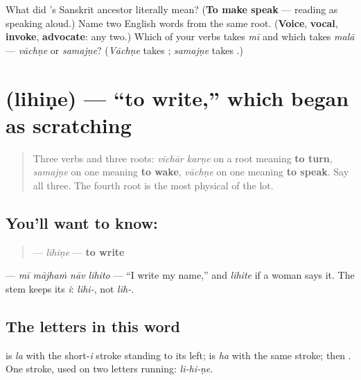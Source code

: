 \begin{tcolorbox}[breakable,colback=teal!4,colframe=teal!35!black,title={Before you move on}]
What did \textbf{}'s Sanskrit ancestor literally mean? (\textbf{To make speak} — reading as speaking aloud.) Name two English words from the same root. (\textbf{Voice}, \textbf{vocal}, \textbf{invoke}, \textbf{advocate}: any two.) Which of your verbs takes \emph{mī} and which takes \emph{malā} — \emph{vāchṇe} or \emph{samajṇe}? (\emph{Vāchṇe} takes \textbf{}; \emph{samajṇe} takes \textbf{}.)
\end{tcolorbox}
\section[lihiṇe]{ (lihiṇe) — \textquotedblleft{}to write,\textquotedblright{} which began as scratching}

\label{lesson:MR-C08-lihine}



\begin{quote}
Three verbs and three roots: \emph{vichār karṇe} on a root meaning \textbf{to turn}, \emph{samajṇe} on one meaning \textbf{to wake}, \emph{vāchṇe} on one meaning \textbf{to speak}. Say all three. The fourth root is the most physical of the lot.
\end{quote}

\subsection*{You'll want to know: }
\begin{quote}
\textbf{} — \emph{lihiṇe} — \textbf{to write}
\end{quote}

\textbf{   } — \emph{mī mājhaṁ nāv lihito} — \textquotedblleft{}I write my name,\textquotedblright{} and \textbf{} \emph{lihite} if a woman says it. The stem keeps its \emph{i}: \emph{lihi-}, not \emph{lih-}.

\subsection*{The letters in this word}
\textbf{} is \textbf{} \emph{la} with the short-\emph{i} stroke standing to its left; \textbf{} is \textbf{} \emph{ha} with the same stroke; then \textbf{}. One stroke, used on two letters running: \emph{li-hi-ṇe}.

